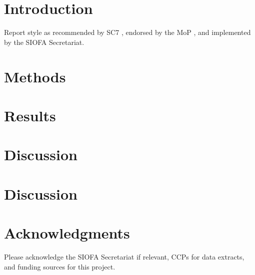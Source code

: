 \section{Introduction}

Report style as recommended by SC7 \citep{SC7}, endorsed by the MoP \citep{MoP9}, and implemented by the SIOFA Secretariat.


\section{Methods}

\section{Results}

\section{Discussion}

\section{Discussion}

\section{Acknowledgments}

Please acknowledge the SIOFA Secretariat if relevant, CCPs for data extracts, and funding sources for this project.
 